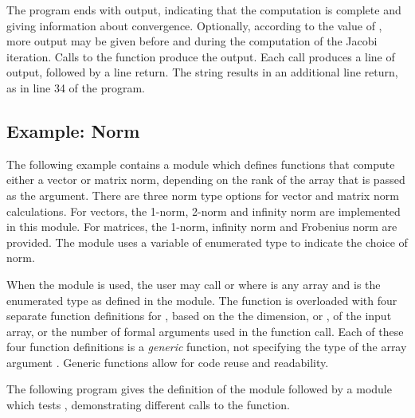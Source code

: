 The program ends with output, indicating that the computation is complete
and giving information about convergence.  Optionally, according to the
value of , more output may be given before and during the
computation of the Jacobi iteration.  Calls to the function 
produce the output.  Each  call
produces a line of output, followed by a line return.  The string 
results in  an additional line return, as in line 34 of the program.

\subsection{Example: Norm}
The following example contains a module  which defines  
 functions that compute either a vector or matrix norm, depending
on the rank of the array that is passed as the argument.  There are three
norm type options for vector and matrix norm calculations.  For vectors,  
the 1-norm, 2-norm and infinity norm are implemented in this module.  
For matrices, the 1-norm, infinity norm and Frobenius norm are provided.   
The module uses a variable of enumerated type  to indicate the choice
of norm.

When the  module is used, the user may call 
 or  where
 is any array and  is the enumerated type as defined
in the  module.  The  function is overloaded with
four separate function definitions for , based on the
the dimension, or , of the input array, or the number of formal
arguments used in the  function call.  Each of these four function
definitions is a {\em generic} function, not specifying the type of the array
argument .  Generic functions allow for code reuse and readability.

The following program gives the definition of the  module followed
by a module which tests , demonstrating different calls to the 
function.

